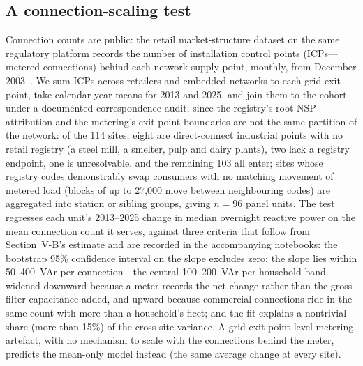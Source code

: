 \documentclass[journal]{IEEEtran}
\begin{document}
\subsection{A connection-scaling test}
Connection counts are public: the retail market-structure dataset on the same
regulatory platform records the number of installation control points
(ICPs---metered connections) behind each network supply point, monthly, from
December 2003~\cite{emi_icp}. We sum ICPs across retailers and embedded networks
to each grid exit point, take calendar-year means for 2013 and 2025, and join
them to the cohort under a documented correspondence audit, since the
registry's root-NSP attribution and the metering's exit-point boundaries are
not the same partition of the network: of the 114 sites, eight are
direct-connect industrial points with no retail registry (a steel mill, a
smelter, pulp and dairy plants), two lack a registry endpoint, one is
unresolvable, and the remaining 103 all enter; sites whose registry codes
demonstrably swap consumers with no matching movement of metered load (blocks
of up to 27,000 move between neighbouring codes) are aggregated into station
or sibling groups, giving $n=96$ panel units. The test
regresses each unit's 2013--2025 change in median overnight reactive power on
the mean connection count it serves, against three criteria that follow from
Section~V-B's estimate and are recorded in the accompanying notebooks: the
bootstrap 95\% confidence interval on the slope excludes zero; the slope lies
within 50--400~VAr per connection---the central 100--200~VAr per-household
band widened downward because a meter records the net change rather than the
gross filter capacitance added, and upward because commercial connections
ride in the same count with more than a household's fleet; and the fit
explains a nontrivial share (more than 15\%) of the cross-site variance. A
grid-exit-point-level metering artefact, with no mechanism to scale with the
connections behind the meter, predicts the mean-only model instead (the same
average change at every site).
\end{document}
